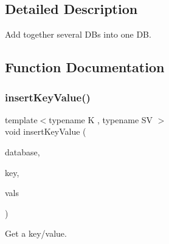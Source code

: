 \subsection{Detailed Description}
Add together several DB\textquotesingle{}s into one DB. 



\subsection{Function Documentation}
\mbox{\label{adat-devel_2main_2dbutil_2dbavg_8cc_a8dcef9d29a9dfc5045f4ee378e94fca3}} 
\subsubsection{\texorpdfstring{insertKeyValue()}{insertKeyValue()}}
{\footnotesize\ttfamily template$<$typename K , typename SV $>$ \\
void insert\+Key\+Value (\begin{DoxyParamCaption}\item[{\mbox{\hyperlink{classFILEDB_1_1AllConfStoreDB}{All\+Conf\+Store\+DB}}$<$ \mbox{\hyperlink{classADATIO_1_1SerialDBKey}{Serial\+D\+B\+Key}}$<$ K $>$, \mbox{\hyperlink{classADATIO_1_1SerialDBData}{Serial\+D\+B\+Data}}$<$ SV $>$ $>$ \&}]{database,  }\item[{\mbox{\hyperlink{classADATIO_1_1SerialDBKey}{Serial\+D\+B\+Key}}$<$ K $>$ \&}]{key,  }\item[{std\+::vector$<$ \mbox{\hyperlink{classADATIO_1_1SerialDBData}{Serial\+D\+B\+Data}}$<$ SV $>$ $>$ \&}]{vals }\end{DoxyParamCaption})}



Get a key/value. 

